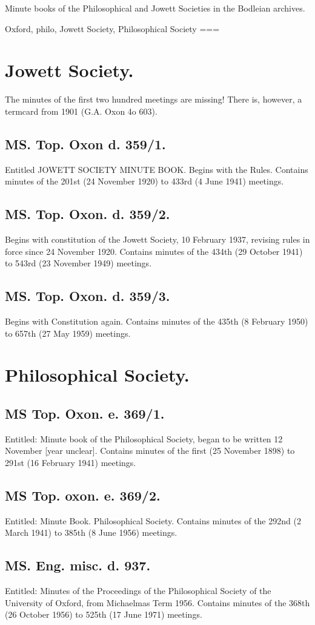 Minute books of the Philosophical and Jowett Societies in the Bodleian archives.

Oxford, philo, Jowett Society, Philosophical Society
===
\section*{Jowett Society.}

The minutes of the first two hundred meetings are missing! There is, however, a termcard from 1901 (G.A. Oxon 4o 603).

\subsection*{MS. Top. Oxon d. 359/1.}
Entitled JOWETT SOCIETY MINUTE BOOK. Begins with the Rules. Contains minutes of the 201st (24 November 1920) to 433rd (4 June 1941) meetings.

\subsection*{MS. Top. Oxon. d. 359/2.}
Begins with constitution of the Jowett Society, 10 February 1937, revising rules in force since 24 November 1920.
Contains minutes of the 434th (29 October 1941) to 543rd (23 November 1949) meetings.

\subsection*{MS. Top. Oxon. d. 359/3.}
Begins with Constitution again. Contains minutes of the 435th (8 February 1950) to 657th (27 May 1959) meetings.

\section*{Philosophical Society.}
\subsection*{MS Top. Oxon. e. 369/1.}
Entitled: Minute book of the Philosophical Society, began to be written 12 November [year unclear]. Contains minutes of the first (25 November 1898) to 291st (16 February 1941) meetings.

\subsection*{MS Top. oxon. e. 369/2.}
Entitled: Minute Book. Philosophical Society. Contains minutes of the 292nd (2 March 1941) to 385th (8 June 1956) meetings.

\subsection*{MS. Eng. misc. d. 937.}
Entitled: Minutes of the Proceedings of the Philosophical Society of the University of Oxford, from Michaelmas Term 1956. Contains minutes of the 368th (26 October 1956) to 525th (17 June 1971) meetings.